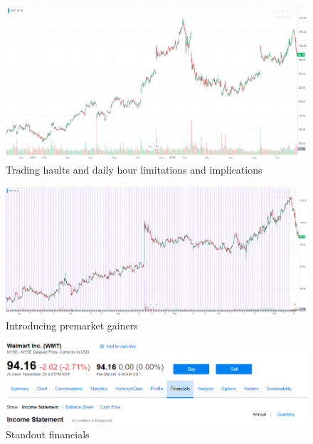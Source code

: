 \documentclass{article}
\begin{document}
\vspace{10pt}

\begin{figure}[!htb]
    \centering
    \includegraphics[width=\textwidth]{imgs/34.png}
    \caption{Trading haults and daily hour limitations and implications}
\end{figure}

\vspace{10pt}

\begin{figure}[!htb]
    \centering
    \includegraphics[width=\textwidth]{imgs/35.png}
    \caption{Introducing premarket gainers}
\end{figure}

\vspace{10pt}

\begin{figure}[!htb]
    \centering
    \includegraphics[width=\textwidth]{imgs/36.png}
    \caption{Standout financials}
\end{figure}
\end{document}
